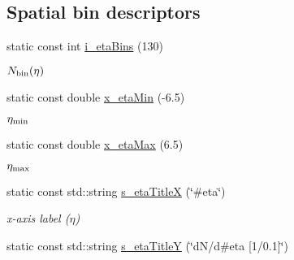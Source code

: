 \subsection*{Spatial bin descriptors}
\begin{CompactItemize}
\item 
\hypertarget{namespaceHistGroupCfg_dbc0d9db5f4c9b113b4f1cffacefb376}{
static const int \hyperlink{namespaceHistGroupCfg_dbc0d9db5f4c9b113b4f1cffacefb376}{i\_\-eta\-Bins} (130)}
\label{namespaceHistGroupCfg_dbc0d9db5f4c9b113b4f1cffacefb376}

\begin{CompactList}\small\item\em $N_{\rm bin}(\eta)$ \item\end{CompactList}\item 
\hypertarget{namespaceHistGroupCfg_9505e0313ebaeebac7264dafb9242c59}{
static const double \hyperlink{namespaceHistGroupCfg_9505e0313ebaeebac7264dafb9242c59}{x\_\-eta\-Min} (-6.5)}
\label{namespaceHistGroupCfg_9505e0313ebaeebac7264dafb9242c59}

\begin{CompactList}\small\item\em $\eta_{\rm min}$ \item\end{CompactList}\item 
\hypertarget{namespaceHistGroupCfg_c66407e26fdec87850c8ec222b55ae0a}{
static const double \hyperlink{namespaceHistGroupCfg_c66407e26fdec87850c8ec222b55ae0a}{x\_\-eta\-Max} (6.5)}
\label{namespaceHistGroupCfg_c66407e26fdec87850c8ec222b55ae0a}

\begin{CompactList}\small\item\em $\eta_{\rm max}$ \item\end{CompactList}\item 
\hypertarget{namespaceHistGroupCfg_5d6d9d7af1235c71f45e095737e8011c}{
static const std::string \hyperlink{namespaceHistGroupCfg_5d6d9d7af1235c71f45e095737e8011c}{s\_\-eta\-Title\-X} (\char`\"{}\#eta\char`\"{})}
\label{namespaceHistGroupCfg_5d6d9d7af1235c71f45e095737e8011c}

\begin{CompactList}\small\item\em x-axis label ($\eta$) \item\end{CompactList}\item 
\hypertarget{namespaceHistGroupCfg_cac4cccfa761ff1c8ee610cae8e87363}{
static const std::string \hyperlink{namespaceHistGroupCfg_cac4cccfa761ff1c8ee610cae8e87363}{s\_\-eta\-Title\-Y} (\char`\"{}d\-N/d\#eta \mbox{[}1/0.1\mbox{]}\char`\"{})}
\label{namespaceHistGroupCfg_cac4cccfa761ff1c8ee610cae8e87363}


\end{CompactItemize}
